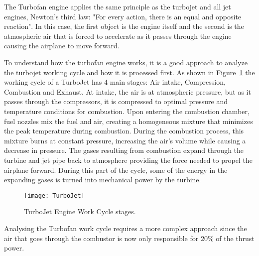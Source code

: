 The Turbofan engine applies the same principle as the turbojet and all jet engines, Newton's third law: "For every action, there is an equal and opposite reaction".
In this case, the first object is the engine itself and the second is the atmospheric air that is forced to accelerate as it passes through the engine causing the airplane to move forward. 

To understand how the turbofan engine works, it is a good approach to analyze the turbojet working cycle and how it is processed first.  
As shown in Figure~\ref{fig:turbojet} the working cycle of a TurboJet has 4 main stages: Air intake, Compression, Combustion and Exhaust.
At intake, the air is at atmospheric pressure, but as it passes through the compressors, it is compressed to optimal pressure and temperature conditions for combustion. Upon entering the combustion chamber, fuel nozzles mix the fuel and air, creating a homogeneous mixture that minimizes the peak temperature during combustion.
During the combustion process, this mixture burns at constant pressure, increasing the air's volume while causing a decrease in pressure. The gases resulting from combustion expand through the turbine and jet pipe back to atmosphere providing the force needed to propel the airplane forward. During this part of the cycle, some of the energy in the expanding gases is turned into mechanical power by the turbine. 

\begin{figure}[H]
    \centering
    \texttt{[image: TurboJet]}
    \caption{TurboJet Engine Work Cycle stages.\cite{RollsRoyce}}
    \label{fig:turbojet}
\end{figure}

Analysing the Turbofan work cycle requires a more complex approach since the air that goes through the combustor is now only responsible for 20\% of the thrust power.

